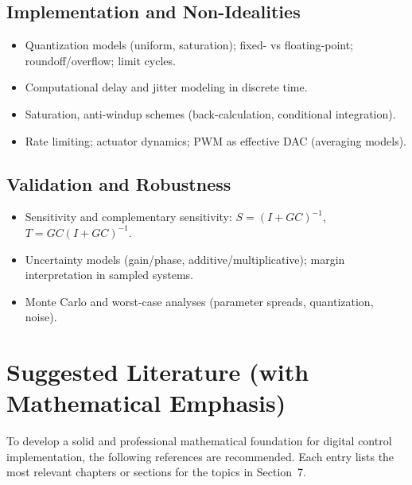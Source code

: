 \documentclass[11pt,a4paper]{article}
\begin{document}
	\subsection*{Implementation and Non-Idealities}
	\begin{itemize}
		\item Quantization models (uniform, saturation); fixed- vs floating-point; roundoff/overflow; limit cycles.
		\item Computational delay and jitter modeling in discrete time.
		\item Saturation, anti-windup schemes (back-calculation, conditional integration).
		\item Rate limiting; actuator dynamics; PWM as effective DAC (averaging models).
	\end{itemize}
	
	\subsection*{Validation and Robustness}
	\begin{itemize}
		\item Sensitivity and complementary sensitivity: $S=(I+GC)^{-1}$, $T=GC(I+GC)^{-1}$.
		\item Uncertainty models (gain/phase, additive/multiplicative); margin interpretation in sampled systems.
		\item Monte Carlo and worst-case analyses (parameter spreads, quantization, noise).
	\end{itemize}
	\section{Suggested Literature (with Mathematical Emphasis)}
	
	To develop a solid and professional mathematical foundation for digital control implementation, the following references are recommended. Each entry lists the most relevant chapters or sections for the topics in Section~7.
	
\end{document}
